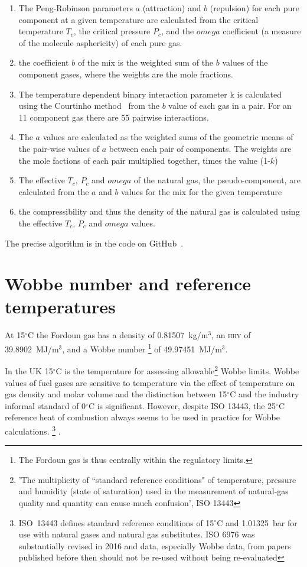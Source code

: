 \documentclass[5p]{elsarticle} %
\begin{document}
\begin{enumerate}
\item The Peng-Robinson\citep{Pina-Martinez2019} parameters $a$ (attraction) and $b$ (repulsion) for each pure component  at a given temperature are calculated from the critical temperature $T_c$, the critical pressure $P_c$, and the $omega$ coefficient (a measure of the molecule asphericity) of each pure gas.
    \item the coefficient $b$ of the mix is   the weighted sum of the $b$ values of the component gases, where the weights are the mole fractions. 
    \item The temperature dependent binary interaction parameter k is calculated using the Courtinho method~\cite{Privat2023} from the $b$ value of each gas in a pair. For an 11 component gas there are 55 pairwise interactions.
    \item The $a$ values are calculated as the weighted sums of the geometric means of the pair-wise values of $a$ between each pair of components. The weights are the mole factions of each pair multiplied together, times the value (1-$k$)
    \item The effective $T_c$, $P_c$ and $omega$ of the natural gas, the pseudo-component,  are calculated from the $a$ and $b$ values for the mix for the given temperature
    \item the compressibility and thus the density of the natural gas is calculated using the effective $T_c$, $P_c$ and $omega$ values.
\end{enumerate}
The precise algorithm is in the code on GitHub~\cite{Sargents_github}.




\section{Wobbe number and reference temperatures}
\label{sec:wobbe}
At 15$^\circ$C the Fordoun gas has  a density of 0.81507~kg/m$^3$, an \textsc{hhv} of 39.8902~MJ/m$^3$, and a Wobbe number
\footnote{The Fordoun gas is thus
centrally within the regulatory limits.
} of 49.97451~MJ/m$^3$.

In the UK 15$^\circ$C is the temperature for assessing allowable\footnote{'The multiplicity of ``standard reference conditions" of temperature, pressure and humidity (state of saturation) used in the measurement of natural-gas quality and quantity can cause much confusion', ISO 13443\citep{ISO13443}} Wobbe limits\citep{GS(M)2023,Lander2017}. Wobbe values of fuel gases are sensitive to temperature via the effect of temperature on gas density and molar volume and the distinction between 15$^\circ$C and the industry informal standard of 0$^\circ$C is significant. However, despite ISO 13443, the 25$^\circ$C reference heat  of combustion always seems to be used in practice for Wobbe calculations.
\footnote{ ISO~13443  defines standard reference conditions of 15$^\circ$C and 1.01325~bar for use with natural gases and natural gas substitutes. ISO 6976 was substantially revised in 2016 and data, especially Wobbe data, from papers published before then should not be re-used without being re-evaluated\citep{Lander2017}
} . 
\end{document}
